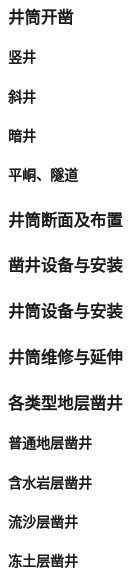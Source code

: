 \documentclass[UTF8]{../../ApplicationUniverse}
\begin{document}
        \subsubsection{井筒开凿}
            \paragraph{竖井}
            \paragraph{斜井}
            \paragraph{暗井}
            \paragraph{平峒、隧道}
        \subsubsection{井筒断面及布置}
        \subsubsection{凿井设备与安装}
        \subsubsection{井筒设备与安装}
        \subsubsection{井筒维修与延伸}
        \subsubsection{各类型地层凿井}
            \paragraph{普通地层凿井}
            \paragraph{含水岩层凿井}
            \paragraph{流沙层凿井}
            \paragraph{冻土层凿井}
\end{document}
